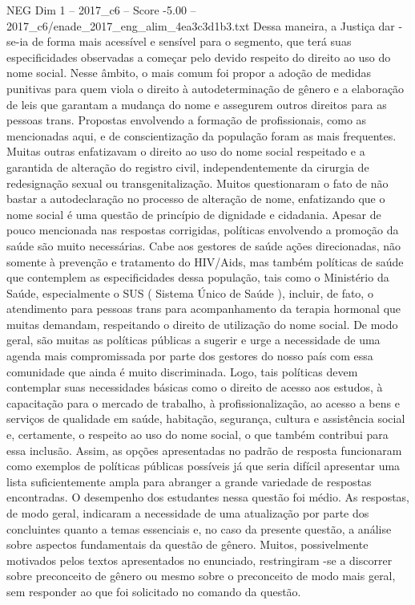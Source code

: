 \begin{textsample}{NEG Dim 1 – 2017\_c6 – Score -5.00 – 2017\_c6/enade\_2017\_eng\_alim\_4ea3c3d1b3.txt}
Dessa maneira, a Justiça dar -se-ia de forma mais acessível e sensível para o segmento, que terá suas especificidades observadas a começar pelo devido respeito do direito ao uso do nome social.
Nesse âmbito, o mais comum foi propor a adoção de medidas punitivas para quem viola o direito à autodeterminação de gênero e a elaboração de leis que garantam a mudança do nome e assegurem outros direitos para as pessoas trans.
Propostas envolvendo a formação de profissionais, como as mencionadas aqui, e de conscientização da população foram as mais frequentes.
Muitas outras enfatizavam o direito ao uso do nome social respeitado e a garantida de alteração do registro civil, independentemente da cirurgia de redesignação sexual ou transgenitalização.
Muitos questionaram o fato de não bastar a autodeclaração no processo de alteração de nome, enfatizando que o nome social é uma questão de princípio de dignidade e cidadania.
Apesar de pouco mencionada nas respostas corrigidas, políticas envolvendo a promoção da saúde são muito necessárias.
Cabe aos gestores de saúde ações direcionadas, não somente à prevenção e tratamento do HIV/Aids, mas também políticas de saúde que contemplem as especificidades dessa população, tais como o Ministério da Saúde, especialmente o SUS ( Sistema Único de Saúde ), incluir, de fato, o atendimento para pessoas trans para acompanhamento da terapia hormonal que muitas demandam, respeitando o direito de utilização do nome social.
De modo geral, são muitas as políticas públicas a sugerir e urge a necessidade de uma agenda mais compromissada por parte dos gestores do nosso país com essa comunidade que ainda é muito discriminada.
Logo, tais políticas devem contemplar suas necessidades básicas como o direito de acesso aos estudos, à capacitação para o mercado de trabalho, à profissionalização, ao acesso a bens e serviços de qualidade em saúde, habitação, segurança, cultura e assistência social e, certamente, o respeito ao uso do nome social, o que também contribui para essa inclusão.
Assim, as opções apresentadas no padrão de resposta funcionaram como exemplos de políticas públicas possíveis já que seria difícil apresentar uma lista suficientemente ampla para abranger a grande variedade de respostas encontradas.
O desempenho dos estudantes nessa questão foi médio.
As respostas, de modo geral, indicaram a necessidade de uma atualização por parte dos concluintes quanto a temas essenciais e, no caso da presente questão, a análise sobre aspectos fundamentais da questão de gênero.
Muitos, possivelmente motivados pelos textos apresentados no enunciado, restringiram -se a discorrer sobre preconceito de gênero ou mesmo sobre o preconceito de modo mais geral, sem responder ao que foi solicitado no comando da questão.

\end{textsample}
